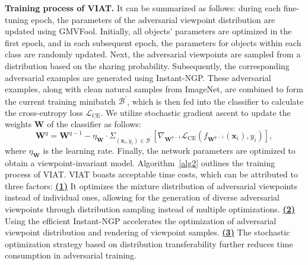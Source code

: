 \documentclass[10pt,journal,compsoc]{IEEEtran}
\begin{document}
\textbf{Training process of VIAT.} It can be summarized as follows: during each fine-tuning epoch, the parameters of the adversarial viewpoint distribution are updated using GMVFool. Initially, all objects' parameters are optimized in the first epoch, and in each subsequent epoch, the parameters for objects within each class are randomly updated. Next, the adversarial viewpoints are sampled from a distribution based on the sharing probability. Subsequently, the corresponding adversarial examples are generated using Instant-NGP. These adversarial examples, along with clean natural samples from ImageNet, are combined to form the current training minibatch $\mathcal{B}^\prime$, which is then fed into the classifier to calculate the cross-entropy loss $\mathcal{L}_{\text{CE}}$. We utilize stochastic gradient ascent to update the weights $\mathbf{W}$ of the classifier as follows:
\begin{equation}
\mathbf{W}^{q} = \mathbf{W}^{q-1}-\eta_{\mathbf{W}} \cdot \Sigma_{(\mathbf{x}_i, y_i)\in \mathcal{B}^\prime}[\nabla_{\mathbf{W}^{q-1}} \mathcal{L}_{\text{CE}}(f_{\mathbf{W}^{q-1}}(\mathbf{x}_i),y_i)],
\label{eq:outer update}
\end{equation}
where $\eta_{\mathbf{W}}$ is the learning rate. Finally, the network parameters are optimized to obtain a viewpoint-invariant model. Algorithm~\ref{alg2} outlines the training process of VIAT. VIAT boasts acceptable time costs, which can be attributed to three factors: \textbf{\underline{(1)}} It optimizes the mixture distribution of adversarial viewpoints instead of individual ones, allowing for the generation of diverse adversarial viewpoints through distribution sampling instead of multiple optimizations. \textbf{\underline{(2)}} Using the efficient Instant-NGP accelerates the optimization of adversarial viewpoint distribution and rendering of viewpoint samples. \textbf{\underline{(3)}} The stochastic optimization strategy based on distribution transferability further reduces time consumption in adversarial training.
\end{document}
